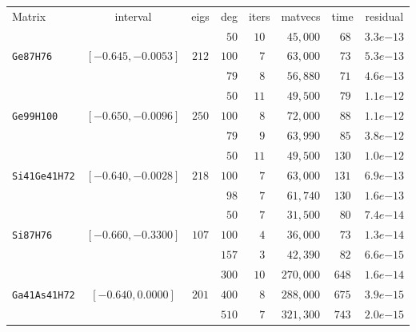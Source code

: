 \begin{tabular}{l|c|c|c|c|c|c|c}
\hline
\multirow{2}{*}{Matrix} & \multirow{2}{*}{interval} & \multirow{2}{*}{eigs} & \multirow{2}{*}{deg} & \multirow{2}{*}{iters} & \multirow{2}{*}{matvecs} & \multirow{2}{*}{time} & \multirow{2}{*}{residual} \\
 & & & & & & & \\\hline
\hline
 & & & $\phantom{0}50$ & $10$ & $\phantom{0}45,000$ & $\phantom{0}68$ & $3.3e{-13}$ \\
\verb|Ge87H76| & $[-0.645,-0.0053]$ & $212$ & $100$ & $\phantom{0}7$ & $\phantom{0}63,000$ & $\phantom{0}73$ & $5.3e{-13}$ \\
 & & & $\phantom{0}79$ & $\phantom{0}8$ & $\phantom{0}56,880$ & $\phantom{0}71$ & $4.6e{-13}$ \\\hline
 & & & $\phantom{0}50$ & $11$ & $\phantom{0}49,500$ & $\phantom{0}79$ & $1.1e{-12}$ \\
\verb|Ge99H100| & $[-0.650,-0.0096]$ & $250$ & $100$ & $\phantom{0}8$ & $\phantom{0}72,000$ & $\phantom{0}88$ & $1.1e{-12}$ \\
 & & & $\phantom{0}79$ & $\phantom{0}9$ & $\phantom{0}63,990$ & $\phantom{0}85$ & $3.8e{-12}$ \\\hline
 & & & $\phantom{0}50$ & $11$ & $\phantom{0}49,500$ & $130$ & $1.0e{-12}$ \\
\verb|Si41Ge41H72| & $[-0.640,-0.0028]$ & $218$ & $100$ & $\phantom{0}7$ & $\phantom{0}63,000$ & $131$ & $6.9e{-13}$ \\
 & & & $\phantom{0}98$ & $\phantom{0}7$ & $\phantom{0}61,740$ & $130$ & $1.6e{-13}$ \\\hline
 & & & $\phantom{0}50$ & $\phantom{0}7$ & $\phantom{0}31,500$ & $\phantom{0}80$ & $7.4e{-14}$ \\
\verb|Si87H76| & $[-0.660,-0.3300]$ & $107$ & $100$ & $\phantom{0}4$ & $\phantom{0}36,000$ & $\phantom{0}73$ & $1.3e{-14}$ \\
 & & & $157$ & $\phantom{0}3$ & $\phantom{0}42,390$ & $\phantom{0}82$ & $6.6e{-15}$ \\\hline
 & & & $300$ & $10$ & $270,000$ & $648$ & $1.6e{-14}$ \\
\verb|Ga41As41H72| & $[-0.640,0.0000]$ & $201$ & $400$ & $\phantom{0}8$ & $288,000$ & $675$ & $3.9e{-15}$ \\
 & & & $510$ & $\phantom{0}7$ & $321,300$ & $743$ & $2.0e{-15}$ \\\hline
\end{tabular}